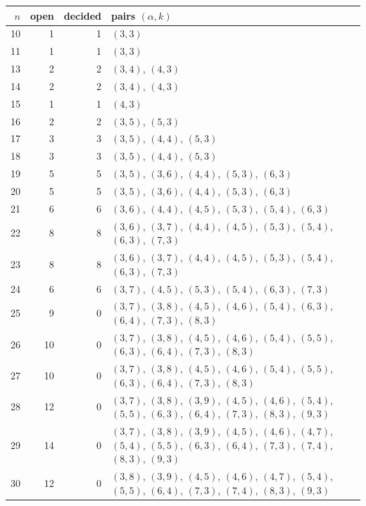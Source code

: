 \begin{tabular}{rrrp{}}
\toprule
$n$ & open & decided & pairs $(\alpha,k)$ \\
\midrule
10 & 1 & 1 & $(3,3)$ \\
11 & 1 & 1 & $(3,3)$ \\
13 & 2 & 2 & $(3,4)$, $(4,3)$ \\
14 & 2 & 2 & $(3,4)$, $(4,3)$ \\
15 & 1 & 1 & $(4,3)$ \\
16 & 2 & 2 & $(3,5)$, $(5,3)$ \\
17 & 3 & 3 & $(3,5)$, $(4,4)$, $(5,3)$ \\
18 & 3 & 3 & $(3,5)$, $(4,4)$, $(5,3)$ \\
19 & 5 & 5 & $(3,5)$, $(3,6)$, $(4,4)$, $(5,3)$, $(6,3)$ \\
20 & 5 & 5 & $(3,5)$, $(3,6)$, $(4,4)$, $(5,3)$, $(6,3)$ \\
21 & 6 & 6 & $(3,6)$, $(4,4)$, $(4,5)$, $(5,3)$, $(5,4)$, $(6,3)$ \\
22 & 8 & 8 & $(3,6)$, $(3,7)$, $(4,4)$, $(4,5)$, $(5,3)$, $(5,4)$, $(6,3)$, $(7,3)$ \\
23 & 8 & 8 & $(3,6)$, $(3,7)$, $(4,4)$, $(4,5)$, $(5,3)$, $(5,4)$, $(6,3)$, $(7,3)$ \\
24 & 6 & 6 & $(3,7)$, $(4,5)$, $(5,3)$, $(5,4)$, $(6,3)$, $(7,3)$ \\
25 & 9 & 0 & $(3,7)$, $(3,8)$, $(4,5)$, $(4,6)$, $(5,4)$, $(6,3)$, $(6,4)$, $(7,3)$, $(8,3)$ \\
26 & 10 & 0 & $(3,7)$, $(3,8)$, $(4,5)$, $(4,6)$, $(5,4)$, $(5,5)$, $(6,3)$, $(6,4)$, $(7,3)$, $(8,3)$ \\
27 & 10 & 0 & $(3,7)$, $(3,8)$, $(4,5)$, $(4,6)$, $(5,4)$, $(5,5)$, $(6,3)$, $(6,4)$, $(7,3)$, $(8,3)$ \\
28 & 12 & 0 & $(3,7)$, $(3,8)$, $(3,9)$, $(4,5)$, $(4,6)$, $(5,4)$, $(5,5)$, $(6,3)$, $(6,4)$, $(7,3)$, $(8,3)$, $(9,3)$ \\
29 & 14 & 0 & $(3,7)$, $(3,8)$, $(3,9)$, $(4,5)$, $(4,6)$, $(4,7)$, $(5,4)$, $(5,5)$, $(6,3)$, $(6,4)$, $(7,3)$, $(7,4)$, $(8,3)$, $(9,3)$ \\
30 & 12 & 0 & $(3,8)$, $(3,9)$, $(4,5)$, $(4,6)$, $(4,7)$, $(5,4)$, $(5,5)$, $(6,4)$, $(7,3)$, $(7,4)$, $(8,3)$, $(9,3)$ \\
\bottomrule
\end{tabular}
